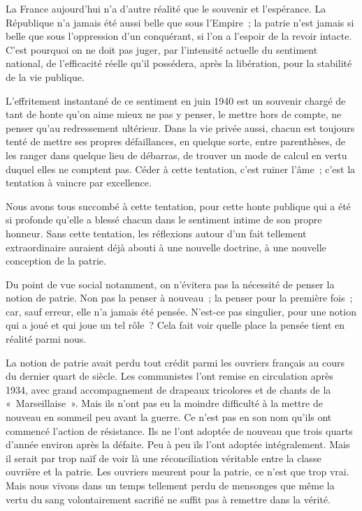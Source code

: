 \documentclass[french,twoside]{book} %
\begin{document}
La France aujourd'hui n'a d'autre réalité que le souvenir et l'espérance. La République n'a jamais été aussi belle que sous l'Empire ; la patrie n'est jamais si belle que sous l'oppression d'un conquérant, si l'on a l'espoir de la revoir intacte. C'est pourquoi on ne doit pas juger, par l'intensité actuelle du sentiment national, de l'efficacité réelle qu'il possédera, après la libération, pour la stabilité de la vie publique.\par
L'effritement instantané de ce sentiment en juin 1940 est un souvenir chargé de tant de honte qu'on aime mieux ne pas y penser, le mettre hors de compte, ne penser qu'au redressement ultérieur. Dans la vie privée aussi, chacun est toujours tenté de mettre ses propres défaillances, en quelque sorte, entre parenthèses, de les ranger dans quelque lieu de débarras, de trouver un mode de calcul en vertu duquel elles ne comptent pas. Céder à cette tentation, c'est ruiner l'âme ; c'est la tentation à vaincre par excellence.\par
Nous avons tous succombé à cette tentation, pour cette honte publique qui a été si profonde qu'elle a blessé chacun dans le sentiment intime de son propre honneur. Sans cette tentation, les réflexions autour d'un fait tellement extraordinaire auraient déjà abouti à une nouvelle doctrine, à une nouvelle conception de la patrie.\par
Du point de vue social notamment, on n'évitera pas la nécessité de penser la notion de patrie. Non pas la penser à nouveau ; la penser pour la première fois ; car, sauf erreur, elle n'a jamais été pensée. N'est-ce pas singulier, pour une notion qui a joué et qui joue un tel rôle ? Cela fait voir quelle place la pensée tient en réalité parmi nous.\par
La notion de patrie avait perdu tout crédit parmi les ouvriers français au cours du dernier quart de siècle. Les communistes l'ont remise en circulation après 1934, avec grand accompagnement de drapeaux tricolores et de chants de la « Marseillaise ». Mais ils n'ont pas eu la moindre difficulté à la mettre de nouveau en sommeil peu avant la guerre. Ce n'est pas en son nom qu'ils ont commencé l'action de résistance. Ils ne l'ont adoptée de nouveau que trois quarts d'année environ après la défaite. Peu à peu ils l'ont adoptée intégralement. Mais il serait par trop naïf de voir là une réconciliation véritable entre la classe ouvrière et la patrie. Les ouvriers meurent pour la patrie, ce n'est que trop vrai. Mais nous vivons dans un temps tellement perdu de mensonges que même la vertu du sang volontairement sacrifié ne suffit pas à remettre dans la vérité.\par
\end{document}
